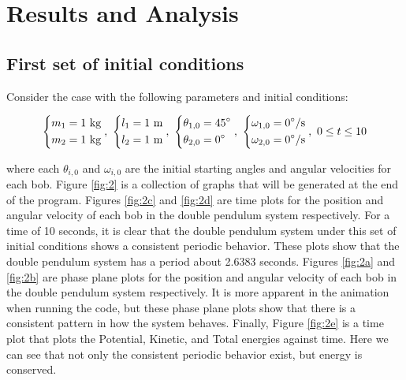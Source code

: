 \section{Results and Analysis}
\subsection{First set of initial conditions}

Consider the case with the following parameters and initial conditions:

\[
\begin{dcases}
    m_1 = 1\ \text{kg}\\
    m_2 = 1\ \text{kg}
\end{dcases},\ \begin{dcases}
    l_1 = 1\ \text{m}\\
    l_2 = 1\ \text{m}
\end{dcases},\ \begin{dcases}
    \theta_{1,0} = 45^\circ\\
    \theta_{2,0} = 0^\circ
\end{dcases},\ \begin{dcases}
    \omega_{1,0} = 0^\circ\text{/s}\\
    \omega_{2,0} = 0^\circ\text{/s}
\end{dcases},\ 0\leq t\leq10
\]

where each $\theta_{i,0}$ and $\omega_{i,0}$ are the initial starting angles and angular velocities for each bob. Figure \ref{fig:2} is a collection of graphs that will be generated at the end of the program. Figures \ref{fig:2c} and \ref{fig:2d} are time plots for the position and angular velocity of each bob in the double pendulum system respectively. For a time of 10 seconds, it is clear that the double pendulum system under this set of initial conditions shows a consistent periodic behavior. These plots show that the double pendulum system has a period about 2.6383 seconds. Figures \ref{fig:2a} and \ref{fig:2b} are phase plane plots for the position and angular velocity of each bob in the double pendulum system respectively. It is more apparent in the animation when running the code, but these phase plane plots show that there is a consistent pattern in how the system behaves. Finally, Figure \ref{fig:2e} is a time plot that plots the Potential, Kinetic, and Total energies against time. Here we can see that not only the consistent periodic behavior exist, but energy is conserved. 


